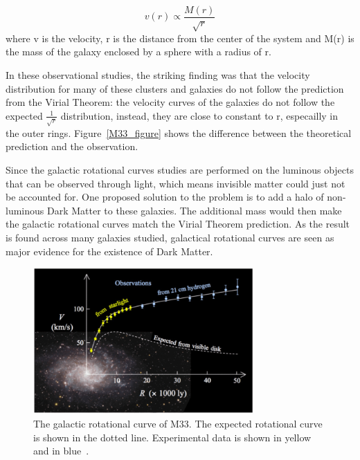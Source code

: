     \begin{equation}
      v(r) \varpropto \frac{M(r)}{\sqrt{r}}
    \end{equation}
     where v is the velocity, r is the distance from the center of the system and M(r) is the mass of the galaxy enclosed by a sphere with a radius of r. 

     In these observational studies, the striking finding was that the velocity distribution for many of these clusters and galaxies do not follow the prediction from the Virial Theorem: the velocity curves of the galaxies do not follow the expected $\frac{1}{\sqrt{r}}$ distribution, instead, they are close to constant to r, especailly in the outer rings. Figure~\ref{M33_figure} shows the difference between the theoretical prediction and the observation. 

     Since the galactic rotational curves studies are performed on the luminous objects that can be observed through light, which means invisible matter could just not be accounted for. One proposed solution to the problem is to add a halo of non-luminous Dark Matter to these galaxies. The additional mass would then make the galactic rotational curves match the Virial Theorem prediction. As the result is found across many galaxies studied, galactical rotational curves are seen as major evidence for the existence of Dark Matter. 

\begin{figure}[!htb]
    \begin{center}
        \includegraphics[width=0.75\textwidth]{figures/chapter_DM/M33-rotation-curve}
        \caption{
            The galactic rotational curve of M33. The expected rotational curve is shown in the dotted line. Experimental data is shown in yellow and in blue~\cite{M33}.
        }
        \label{fig:M33_figure}
    \end{center}
\end{figure}

